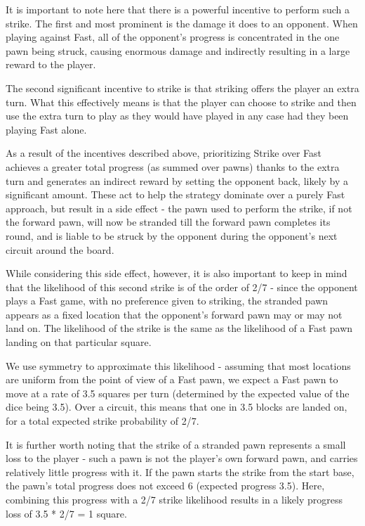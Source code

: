 \documentclass{article} %
\begin{document}
It is important to note here that there is a powerful incentive to perform such a strike. The first and most prominent is the damage it does to an opponent. When playing against Fast, all of the opponent’s progress is concentrated in the one pawn being struck, causing enormous damage and indirectly resulting in a large reward to the player.

The second significant incentive to strike is that striking offers the player an extra turn. What this effectively means is that the player can choose to strike and then use the extra turn to play as they would have played in any case had they been playing Fast alone.

As a result of the incentives described above, prioritizing Strike over Fast achieves a greater total progress (as summed over pawns) thanks to the extra turn and generates an indirect reward by setting the opponent back, likely by a significant amount. These act to help the strategy dominate over a purely Fast approach, but result in a side effect - the pawn used to perform the strike, if not the forward pawn, will now be stranded till the forward pawn completes its round, and is liable to be struck by the opponent during the opponent’s next circuit around the board.

While considering this side effect, however, it is also important to keep in mind that the likelihood of this second strike is of the order of 2/7 - since the opponent plays a Fast game, with no preference given to striking, the stranded pawn appears as a fixed location that the opponent’s forward pawn may or may not land on. The likelihood of the strike is the same as the likelihood of a Fast pawn landing on that particular square. 

We use symmetry to approximate this likelihood - assuming that most locations are uniform from the point of view of a Fast pawn, we expect a Fast pawn to move at a rate of 3.5 squares per turn (determined by the expected value of the dice being 3.5). Over a circuit, this means that one in 3.5 blocks are landed on, for a total expected strike probability of 2/7.

It is further worth noting that the strike of a stranded pawn represents a small loss to the player - such a pawn is not the player’s own forward pawn, and carries relatively little progress with it. If the pawn starts the strike from the start base, the pawn’s total progress does not exceed 6 (expected progress 3.5). Here, combining this progress with a 2/7 strike likelihood results in a likely progress loss of 3.5 * 2/7 = 1 square.
\end{document}
